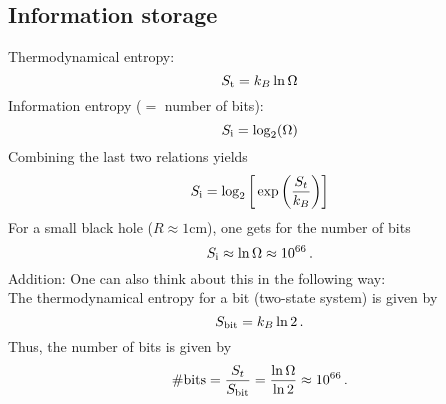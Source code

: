 \subsection{Information storage}
    Thermodynamical entropy:
    \begin{equation}
        S_\textnormal{t}=k_B\ln{\Omega}
        \label{}
    \end{equation}
    Information entropy ($=$ number of bits):
    \begin{equation}
        S_\textnormal{i}=\log_2(\Omega)
    \end{equation}
    Combining the last two relations yields
    \begin{equation}
        S_\textnormal{i}=\log_2\bigg[\exp\bigg(\frac{S_t}{k_B}\bigg)\bigg]
    \end{equation}
    For a small black hole ($R\approx 1$cm), one gets for the number of bits
    \begin{equation}
        S_\textnormal{i} \approx \ln{\Omega} \approx 10^{66} \,.
    \end{equation}
    Addition: One can also think about this in the following way:\\
    The thermodynamical entropy for a bit (two-state system) is given by
    \begin{equation}
        S_\textnormal{bit} = k_B \ln 2 \,.
    \end{equation}
    Thus, the number of bits is given by
    \begin{equation}
        \# \textnormal{bits} = \frac{S_t}{S_\textnormal{bit}} = \frac{\ln{\Omega}}{\ln 2} \approx 10^{66} \,.
    \end{equation}

